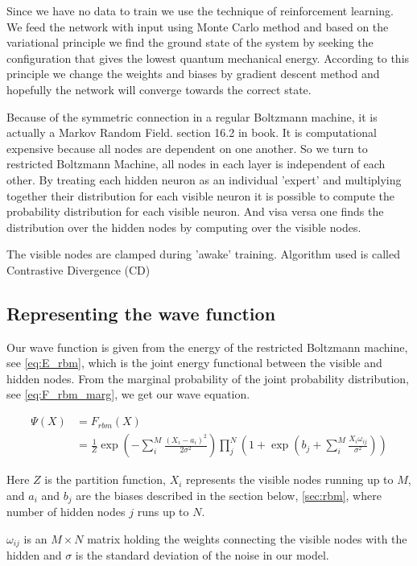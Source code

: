 Since we have no data to train we use the technique of reinforcement learning. We feed the network with input using Monte Carlo method and based on the variational principle we find the ground state of the system by seeking the configuration that gives the lowest quantum mechanical energy. According to this principle we change the weights and biases by gradient descent method and hopefully the network will converge towards the correct state.  

Because of the symmetric connection in a regular Boltzmann machine, it is actually a Markov Random Field. section 16.2 in book. 
It is computational expensive because all nodes are dependent on one another. 
So we turn to restricted Boltzmann Machine, all nodes in each layer is independent of each other. By treating each hidden neuron as an individual 'expert' and multiplying together their distribution for each visible neuron it is possible to compute the probability distribution for each visible neuron. And visa versa one finds the distribution over the hidden nodes by computing over the visible nodes. 

The visible nodes are clamped during 'awake' training. 
Algorithm used is called Contrastive Divergence (CD)

\subsection{Representing the wave function}

Our wave function is given from the energy of the restricted Boltzmann machine, see \eqref{eq:E_rbm}, which is the joint energy functional between the visible and hidden nodes. From the marginal probability of the joint probability distribution, see \eqref{eq:F_rbm_marg}, we get our wave equation.                     

\begin{align}\label{eq:F_rbm}
\Psi(X) &= F_{rbm}(X) \\
&= \frac{1}{Z} \exp \left( -\sum_{i}^{M} \frac{(X_i - a_i)^2}{2 \sigma^2} \right) \prod_{j}^{N} \left( 1 + \exp \left( b_j + \sum_{i}^{M} \frac{X_i \omega_{ij}}{\sigma^2} \right) \right)
\end{align}

Here $Z$ is the partition function, $X_i$ represents the visible nodes running up to $M$, and $a_i$ and $b_j$ are the biases described in the section below, \eqref{sec:rbm}, where number of hidden nodes $j$ runs up to $N$. 

$\omega_{ij}$ is an $M \times N$ matrix holding the weights connecting the visible nodes with the hidden and $\sigma$ is the standard deviation of the noise in our model. \\


